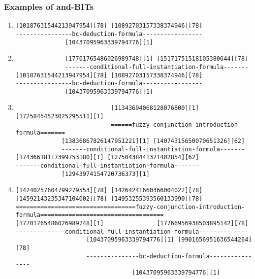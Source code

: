 \documentclass{beamer}
\begin{document}
\begin{frame}[fragile]
  \frametitle{Examples of and-BITs}
  \begin{enumerate}

  \item
    {\Tiny
\begin{verbatim}
[10187631544213947954][78] [10892703157338374946][78]
----------------bc-deduction-formula-----------------
              [10437095963339794776][1]
\end{verbatim}
    }

  \item
    {\Tiny
\begin{verbatim}
              [17701765486026989748][1] [15171751518105380644][78]
              -------conditional-full-instantiation-formula-------
[10187631544213947954][78] [10892703157338374946][78]
----------------bc-deduction-formula-----------------
              [10437095963339794776][1]
\end{verbatim}
    }

  \item
    {\Tiny
\begin{verbatim}
                           [11343694068128076800][1] [17258454523025295511][1]
                           ======fuzzy-conjunction-introduction-formula=======
             [13836867826147951221][1] [14074315650070651326][62]
             -------conditional-full-instantiation-formula-------
[17436618117399753180][1] [12750438441371402854][62]
-------conditional-full-instantiation-formula-------
             [12943974154720736373][1]
\end{verbatim}
    }

  \item
    {\Tiny
\begin{verbatim}
[14240257604799279553][78] [14264241660366004022][78] [14592143235347104002][78] [14953255393560133990][78]
==================================fuzzy-conjunction-introduction-formula===================================
[17701765486026989748][1]               [17766956938503895142][78]
--------------conditional-full-instantiation-formula--------------
                    [10437095963339794776][1] [9901656951636544264][78]
                    ---------------bc-deduction-formula----------------
                                 [10437095963339794776][1]
\end{verbatim}
    }


\end{enumerate}
\end{frame}
\end{document}
